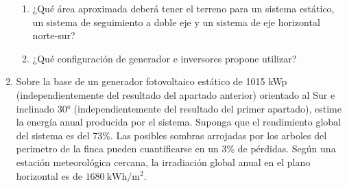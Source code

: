 \begin{enumerate}
\begin{enumerate}
\item ¿Qué área aproximada deberá tener el terreno para un sistema estático,
un sistema de seguimiento a doble eje y un sistema de eje horizontal
norte-sur? 
\item ¿Qué configuración de generador e inversores propone utilizar?
\end{enumerate}
\item Sobre la base de un generador fotovoltaico estático de 1015 kWp (independientemente
del resultado del apartado anterior) orientado al Sur e inclinado
$\ang{30}$ (independientemente del resultado del primer apartado),
estime la energía anual producida por el sistema. Suponga que el rendimiento
global del sistema es del 73\%. Las posibles sombras arrojadas por
los arboles del perimetro de la finca pueden cuantificarse en un 3\%
de pérdidas. Según una estación meteorológica cercana, la irradiación
global anual en el plano horizontal es de $\SI{1680}{\kWh\per\meter\squared}$. 
\end{enumerate}


